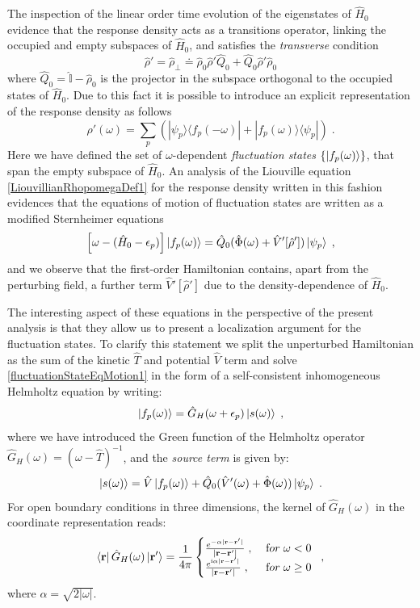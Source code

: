 \documentclass[reprint,aps,prb]{revtex4-1}
\renewcommand{\r}{{\bf r}}
\newcommand{\eps}{\epsilon}
\newcommand{\ii}{\mathrm{i}}
\newcommand{\be}{\begin{equation}}
\newcommand{\ee}{\end{equation}}
\newcommand{\nn}{\notag}
\newcommand{\lb}{\label}
\newcommand{\op}[1]{\hat {#1}}
\newcommand{\ketbra}[2]{| #1 \rangle \langle #2 |}
\newcommand{\dmnot}{\op{\rho}_0}
\newcommand{\dm}{\op{\rho}}
\newcommand{\hnot}{\op{H}_0}
\newcommand{\identity}{\op{\mathbb I}}
\begin{document}
The inspection of the linear order time evolution of the eigenstates of $\hnot$ evidence that the response density acts as a transitions operator, linking the occupied and empty subspaces 
of $\hnot$, and satisfies the \emph{transverse} condition  
\be\lb{RhopTransverseDef1}
\dm' = \dm_{\perp} \doteq \dmnot\dm'\op Q_0 + \op Q_0\dm'\dmnot
\ee
where $\op Q_0=\identity-\dmnot$ is the projector in the subspace orthogonal to the occupied states of $\hnot$. Due to this fact it is possible to introduce an explicit representation of the 
response density as follows 
\be\lb{rhoPrimeFluctuationStateDef1}
\dm'(\omega) = \sum_p\left(\ketbra{\psi_p}{f_p(-\omega)} + \ketbra{f_p(\omega)}{\psi_p}\right) \;.
\ee
Here we have defined the set of $\omega$-dependent \emph{fluctuation states} $\{\ket{f_p(\omega)}\}$, that span the empty subspace of $\hnot$. 
An analysis of the Liouville equation \eqref{LiouvillianRhopomegaDef1} for the response density written in this fashion evidences that the equations of motion of fluctuation states are 
written as a modified Sternheimer equations \cite{mahan1980}
\be\lb{fluctuationStateEqMotion1}
\left[\omega - (\hnot-\eps_p)\right]\ket{f_p(\omega)} = \op Q_0(\op\Phi(\omega)+\op V'[\dm'])\ket{\psi_p} \;,
\ee
and we observe that the first-order Hamiltonian contains, apart from the perturbing field, a further term $\op V'[\dm']$ due to the density-dependence of $\hnot$.

The interesting aspect of these equations in the perspective of the present analysis is that they allow us to present a localization argument for the fluctuation 
states. To clarify this statement we split the unperturbed Hamiltonian as the sum of the kinetic $\op T$ and potential $\op V$ term and solve \eqref{fluctuationStateEqMotion1} in the form 
of a self-consistent inhomogeneous Helmholtz equation by writing:
\be\lb{rhoPrimeFluctuationStateDef2}
\ket{f_p(\omega)} = \op G_H(\omega+\epsilon_p)\ket{s(\omega)} \;,
\ee
where we have introduced the Green function of the Helmholtz operator $\op G_H(\omega) = (\omega-\op T)^{-1}$,
and the \emph{source term} is given by:
\be
\ket{s(\omega)} =  \op V\ket{f_p(\omega)} + \op Q_0(\op V'(\omega) + \op \Phi(\omega))\ket{\psi_p} \;.\nn
\ee
For open boundary conditions in three dimensions, the kernel of $\op G_H(\omega)$ in the coordinate representation reads: 
\be\lb{HelmholtzKernelDef1}
\bra{\r} \op G_H(\omega) \ket{\r'} = \frac{1}{4\pi} \begin{cases}
\frac{e^{-\alpha|\r - \r' |}}{|\r- \r' |} \;,\; & {\textrm for}\; \omega  < 0\; \\ 
\frac{e^{\ii \alpha |\r-\r' |}}{|\r-\r' |} \;, & {\textrm for} \; \omega \geq 0
\end{cases} \;,
\ee
where $\alpha = \sqrt{2|\omega|}$. 
\end{document}
